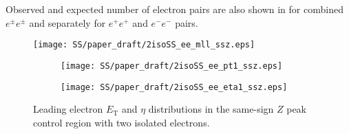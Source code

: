 Observed and expected number of electron pairs are also shown in  for combined $e^{\pm}e^{\pm}$ and separately for $e^{+}e^{+}$ and $e^{-}e^{-}$ pairs.

\begin{figure}[h]
\begin{center}
\texttt{[image: SS/paper\_draft/2isoSS\_ee\_mll\_ssz.eps]}
\caption{\toDo}
\label{fig:charge_flip_CR_inv_mass}
\end{center}
\end{figure} 

\begin{figure}
\begin{subfigure}{.5\textwidth}
  \centering
  \texttt{[image: SS/paper\_draft/2isoSS\_ee\_pt1\_ssz.eps]}
\end{subfigure}%
\begin{subfigure}{.5\textwidth}
  \centering
  \texttt{[image: SS/paper\_draft/2isoSS\_ee\_eta1\_ssz.eps]}
\end{subfigure}
\caption{\toDo Leading electron $E_\mathrm{T}$ and $\eta$ distributions in the same-sign $Z$ peak control region with two isolated electrons.}
  \label{fig:charge_flip_CR_kinematics}
\end{figure}


